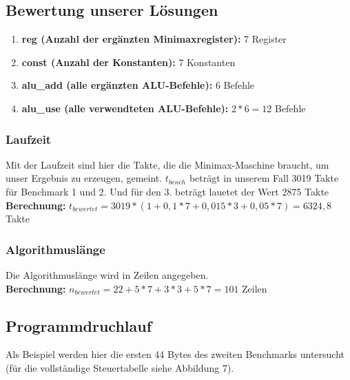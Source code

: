 \documentclass[12pt,titlepage]{article}
\begin{document}
\subsection{Bewertung unserer Lösungen}

\begin{enumerate}
\item \textbf{reg (Anzahl der ergänzten Minimaxregister): } 7 Register
\item \textbf{const (Anzahl der Konstanten): } 7 Konstanten
\item \textbf{alu\_add (alle erg{\"a}nzten ALU-Befehle):} 6 Befehle
\item \textbf{alu\_use (alle verwendteten ALU-Befehle):} $2*6 = 12$ Befehle
\end{enumerate}

\subsubsection{Laufzeit}
Mit der Laufzeit sind hier die Takte, die die Minimax-Maschine braucht, um unser Ergebnis zu erzeugen, gemeint. $t_{bench}$ betr{\"a}gt in unserem Fall 3019 Takte für Benchmark 1 und 2. Und für den 3. beträgt lauetet der Wert 2875 Takte\\

\textbf{Berechnung:} $t_{bewertet} = 3019 * (1 + 0,1*7 + 0,015*3 + 0,05 * 7) = 6324,8$ Takte

\subsubsection{Algorithmuslänge}
Die Algorithmuslänge wird in Zeilen angegeben.\\

\textbf{Berechnung:} $n_{bewertet} = 22 + 5*7 + 3*3 + 5*7 = 101$ Zeilen


\newpage

\subsection{Programmdruchlauf}
Als Beispiel werden hier die ersten 44 Bytes des zweiten Benchmarks untersucht (für die vollständige Steuertabelle siehe Abbildung 7).

\leavevmode \\
\end{document}
